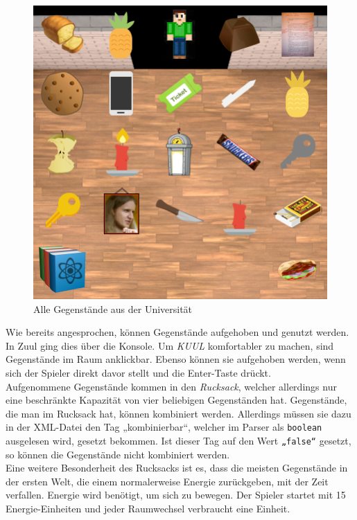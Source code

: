 \documentclass[12pt,twoside]{article}
\theoremstyle{plain}
\theoremstyle{definition}
\theoremstyle{remark}
\begin{document}
\begin{figure}[h!bt]
    \begin{center}
        \includegraphics[scale=1]{Gegenstaende_Welt-1.png}
    	\caption{Alle Gegenstände aus der Universität}
        \label{fig:main_items}
    \end{center}
\end{figure}
\label{ssec:main_func}
Wie bereits angesprochen, können Gegenstände aufgehoben und genutzt werden.\\
In Zuul ging dies über die Konsole.
Um \textit{KUUL} komfortabler zu machen, sind Gegenstände im Raum anklickbar.
Ebenso können sie aufgehoben werden, wenn sich der Spieler direkt davor stellt und die Enter-Taste drückt.\\%
Aufgenommene Gegenstände kommen in den \textit{Rucksack}, welcher allerdings nur eine beschränkte Kapazität von vier beliebigen Gegenständen hat.
Gegenstände, die man im Rucksack hat, können kombiniert werden.
Allerdings müssen sie dazu in der XML-Datei den Tag „kombinierbar“, welcher im Parser als \texttt{boolean} ausgelesen wird, gesetzt bekommen.
Ist dieser Tag auf den Wert \texttt{„false“} gesetzt, so können die Gegenstände nicht kombiniert werden.\\
Eine weitere Besonderheit des Rucksacks ist es, dass die meisten Gegenstände in der ersten Welt, die einem normalerweise Energie zurückgeben, mit der Zeit verfallen.
Energie wird benötigt, um sich zu bewegen. Der Spieler startet mit 15 Energie-Einheiten und jeder Raumwechsel verbraucht eine Einheit.
\end{document}
